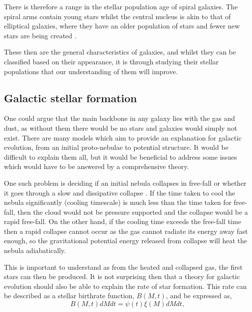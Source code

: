 \documentclass[12pt, twocolumn]{revtex4}    %
\begin{document}
There is therefore a range in the stellar population age of spiral galaxies. The spiral arms contain young stars whilst the central nucleus is akin to that of elliptical galaxies, where they have an older population of stars and fewer new stars are being created \citep{carroll_astro, binney_galaxies}.

These then are the general characteristics of galaxies, and whilst they can be classified based on their appearance, it is through studying their stellar populations that our understanding of them will improve. 


\subsection{Galactic stellar formation}


One could argue that the main backbone in any galaxy lies with the gas and dust, as without them there would be no stars and galaxies would simply not exist. There are many models which aim to provide an explanation for galactic evolution, from an initial proto-nebulae to potential structure. It would be difficult to explain them all, but it would be beneficial to address some issues which would have to be answered by a comprehensive theory. 

One such problem is deciding if an initial nebula collapses in free-fall or whether it goes through a slow and dissipative collapse \citep{carroll_astro}. If the time taken to cool the nebula significantly (cooling timescale) is much less than the time taken for free-fall, then the cloud would not be pressure supported and the collapse would be a rapid free-fall. On the other hand, if the cooling time exceeds the free-fall time then a rapid collapse cannot occur as the gas cannot radiate its energy away fast enough, so the gravitational potential energy released from collapse will heat the nebula adiabatically. 

This is important to understand as from the heated and collapsed gas, the first stars can then be produced. It is not surprising then that a theory for galactic evolution should also be able to explain the rate of star formation. This rate can be described as a stellar birthrate function, $B(M,t)$, and be expressed as,
\begin{equation}
B(M,t)dM dt = \psi (t) \xi (M) dM dt, 
\label{eqn:stellar_birth_rate}
\end{equation}
\end{document}
